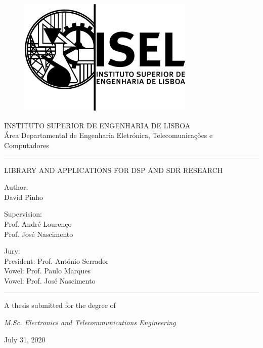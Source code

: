\documentclass[11pt]{report}
\begin{document}
\begin{titlepage}
\begin{figure}[ht]
  \centering
  \includegraphics[width=0.75\textwidth]{logo_isel}
  \label{fig:logo_isel}
\end{figure}
\begin{center}
  \vspace*{1cm}
  \LARGE
  INSTITUTO SUPERIOR DE ENGENHARIA DE LISBOA\\
  \Large
  Área Departamental de Engenharia Eletrónica, Telecomunicações e Computadores
  \par\noindent\rule{0.5\textwidth}{1pt}\par

  \vspace{1cm}
  \LARGE
  LIBRARY AND APPLICATIONS FOR DSP AND SDR RESEARCH

  \vspace{0.75cm}
  \normalsize
  Author:\\
  David Pinho

  \vspace{0.5cm}
  Supervision:\\
  Prof. André Lourenço\\
  Prof. José Nascimento

  \vspace{1.0cm}
  Jury:\\
  President: Prof. António Serrador\\
  Vowel: Prof. Paulo Marques\\
  Vowel: Prof. José Nascimento
  \vfill
  \par\noindent\rule{0.5\textwidth}{1pt}\par
  A thesis submitted for the degree of

  \emph{M.Sc. Electronics and Telecommunications Engineering}

  July 31, 2020

\end{center}
\end{titlepage}
\end{document}
